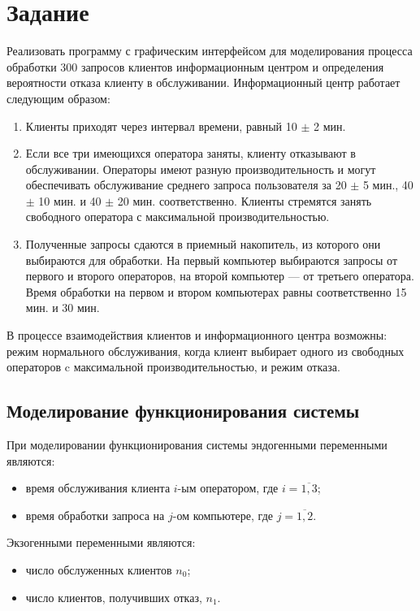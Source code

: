 \chapter{Задание}

Реализовать программу с графическим интерфейсом для моделирования процесса обработки 300 запросов клиентов информационным центром и определения вероятности отказа клиенту в обслуживании. Информационный центр работает следующим образом:

\begin{enumerate}
	\item Клиенты приходят через интервал времени, равный 10 $\pm$ 2 мин.
	\item Если все три имеющихся оператора заняты, клиенту отказывают в обслуживании. Операторы имеют разную производительность и могут обеспечивать обслуживание среднего запроса пользователя за 20 $\pm$ 5 мин., 40 $\pm$ 10 мин. и 40 $\pm$ 20 мин. соответственно. Клиенты стремятся занять свободного оператора с максимальной производительностью.
	\item Полученные запросы сдаются в приемный накопитель, из которого они выбираются для обработки. На первый компьютер выбираются запросы от первого и второго операторов, на второй компьютер --- от третьего оператора. Время обработки на первом и втором компьютерах равны соответственно 15 мин. и 30 мин.
\end{enumerate}

В процессе взаимодействия клиентов и информационного центра возможны: режим нормального обслуживания, когда клиент выбирает одного из свободных операторов c максимальной производительностью, и режим отказа.

\section{Моделирование функционирования системы}

При моделировании функционирования системы эндогенными переменными являются:

\begin{itemize}
	\item время обслуживания клиента $i$-ым оператором, где $i = \overline{1, 3}$;
	\item время обработки запроса на $j$-ом компьютере, где $j = \overline{1, 2}$.
\end{itemize}

Экзогенными переменными являются:

\begin{itemize}
	\item число обслуженных клиентов $n_{0}$;
	\item число клиентов, получивших отказ, $n_{1}$.
\end{itemize}

